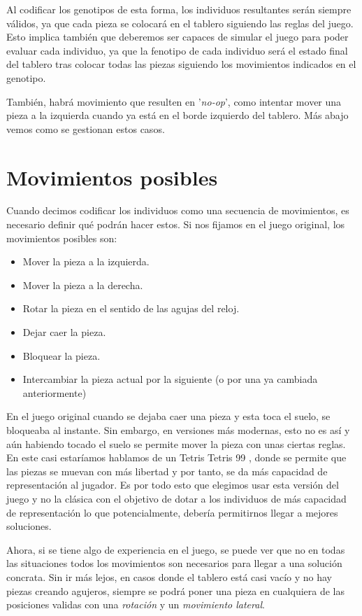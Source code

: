 \documentclass[11pt,spanish,listoffigures,listoftables]{tfgetsinf}
\begin{document}
Al codificar los genotipos de esta forma, los individuos resultantes serán siempre válidos, ya que cada pieza se colocará en el tablero siguiendo las reglas del juego. Esto implica también que deberemos ser capaces de simular el juego para poder evaluar cada individuo, ya que la fenotipo de cada individuo será el estado final del tablero tras colocar todas las piezas siguiendo los movimientos indicados en el genotipo. 

También, habrá movimiento que resulten en '\textit{no-op}', como intentar mover una pieza a la izquierda cuando ya está en el borde izquierdo del tablero. Más abajo vemos como se gestionan estos casos.

\section{Movimientos posibles}
Cuando decimos codificar los individuos como una secuencia de movimientos, es necesario definir qué podrán hacer estos. Si nos fijamos en el juego original, los movimientos posibles son:

\begin{itemize}
    \item Mover la pieza a la izquierda.
    \item Mover la pieza a la derecha.
    \item Rotar la pieza en el sentido de las agujas del reloj.
    \item Dejar caer la pieza.
    \item Bloquear la pieza.
    \item Intercambiar la pieza actual por la siguiente (o por una ya cambiada anteriormente)
\end{itemize}

En el juego original cuando se dejaba caer una pieza y esta toca el suelo, se bloqueaba al instante. Sin embargo, en versiones más modernas, esto no es así y aún habiendo tocado el suelo se permite mover la pieza con unas ciertas reglas. En este casi estaríamos hablamos de un Tetris Tetris 99 \cite{}, donde se permite que las piezas se muevan con más libertad y por tanto, se da más capacidad de representación al jugador. Es por todo esto que elegimos usar esta versión del juego y no la clásica con el objetivo de dotar a los individuos de más capacidad de representación lo que potencialmente, debería permitirnos llegar a mejores soluciones.

Ahora, si se tiene algo de experiencia en el juego, se puede ver que no en todas las situaciones todos los movimientos son necesarios para llegar a una solución concrata. Sin ir más lejos, en casos donde el tablero está casi vacío y no hay piezas creando agujeros, siempre se podrá poner una pieza en cualquiera de las posiciones validas con una \textit{rotación} y un \textit{movimiento lateral}. 
\end{document}
